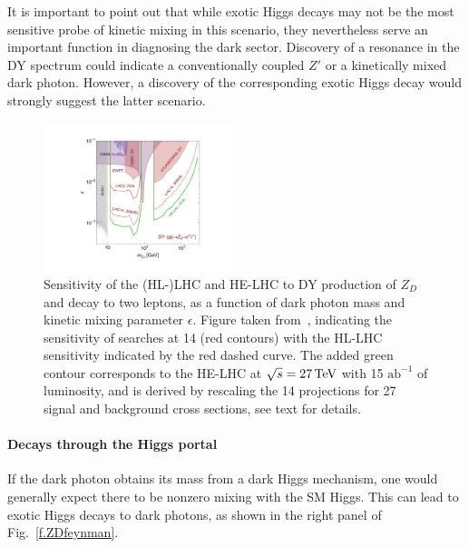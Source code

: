 It is important to point out that while exotic Higgs decays may not be the most sensitive probe of kinetic mixing in this scenario, they nevertheless serve an important function in diagnosing the dark sector. Discovery of a resonance in the DY spectrum could indicate a conventionally coupled $Z'$ or a kinetically mixed dark photon. However, a  discovery of the  corresponding exotic Higgs decay would strongly suggest the latter scenario. 


\begin{figure}
\begin{center}
\includegraphics[width=0.5\textwidth]{section9/plots/new_DYplot_epsilon}
\end{center}
\caption{
Sensitivity of the (HL-)LHC and HE-LHC to DY production of $Z_D$ and decay to two leptons,  as a function of dark photon mass and kinetic mixing parameter $\epsilon$. Figure taken from~\cite{Curtin:2014cca}, indicating the sensitivity of searches at 14 \UTeV (red contours) with the HL-LHC sensitivity indicated by the red dashed curve. The added green contour corresponds to the HE-LHC at $\sqrt{s} = 27 \,\text{Te\hspace{-.08em}V}$ with 15 $\mathrm{ab}^{-1}$ of luminosity, and is derived by rescaling the 14 \UTeV projections for 27 \UTeV signal and background cross sections, see text for details. 
}
\label{f.darkphotonDY}
\end{figure}


\bigskip

\paragraph{Decays through the Higgs portal}

If the dark photon obtains its mass from a dark Higgs mechanism, one would generally expect there to be nonzero mixing with the SM Higgs. This can lead to exotic Higgs decays to dark photons, as shown in the right panel of Fig.~\ref{f.ZDfeynman}. 


